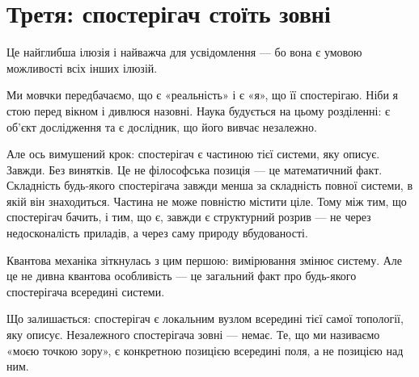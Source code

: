 \documentclass[12pt, a4paper, openany]{book}
\begin{document}
\section{Третя: спостерігач стоїть зовні}

Це найглибша ілюзія і найважча для усвідомлення --- бо вона є умовою можливості всіх інших ілюзій.

Ми мовчки передбачаємо, що є «реальність» і є «я», що її спостерігаю. Ніби я стою перед вікном і дивлюся назовні. Наука будується на цьому розділенні: є об'єкт дослідження та є дослідник, що його вивчає незалежно.

Але ось вимушений крок: спостерігач є частиною тієї системи, яку описує. Завжди. Без винятків. Це не філософська позиція --- це математичний факт. Складність будь-якого спостерігача завжди менша за складність повної системи, в якій він знаходиться. Частина не може повністю містити ціле. Тому між тим, що спостерігач бачить, і тим, що є, завжди є структурний розрив --- не через недосконалість приладів, а через саму природу вбудованості.

Квантова механіка зіткнулась з цим першою: вимірювання змінює систему. Але це не дивна квантова особливість --- це загальний факт про будь-якого спостерігача всередині системи.

Що залишається: спостерігач є локальним вузлом всередині тієї самої топології, яку описує. Незалежного спостерігача зовні --- немає. Те, що ми називаємо «моєю точкою зору», є конкретною позицією всередині поля, а не позицією над ним.
\end{document}
